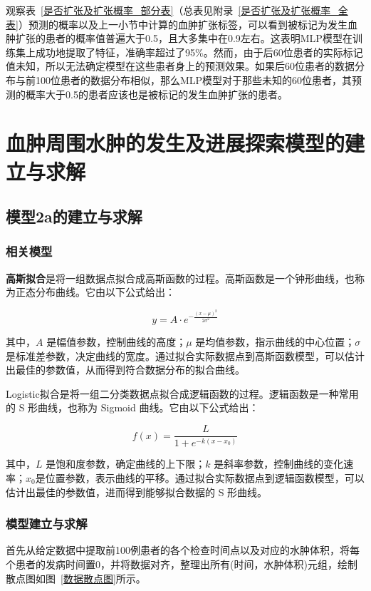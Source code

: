 \documentclass[bwprint]{gmcmthesis}
\begin{document}
观察表~\ref{是否扩张及扩张概率_部分表}（总表见附录~\ref{是否扩张及扩张概率_全表}）预测的概率以及上一小节中计算的血肿扩张标签，可以看到被标记为发生血肿扩张的患者的概率值普遍大于0.5，且大多集中在0.9左右。这表明MLP模型在训练集上成功地提取了特征，准确率超过了95\%。然而，由于后60位患者的实际标记值未知，所以无法确定模型在这些患者身上的预测效果。如果后60位患者的数据分布与前100位患者的数据分布相似，那么MLP模型对于那些未知的60位患者，其预测的概率大于0.5的患者应该也是被标记的发生血肿扩张的患者。

\section{血肿周围水肿的发生及进展探索模型的建立与求解}
\subsection{模型2a的建立与求解}\label{残差计算}
\subsubsection{相关模型}\label{2种回归的章节}

\textbf{高斯拟合}\cite{Wang2018AmphibianSR}是将一组数据点拟合成高斯函数的过程。高斯函数是一个钟形曲线，也称为正态分布曲线。它由以下公式给出：

\begin{equation}
y = A \cdot e^{-\frac{(x - \mu)^2}{2\sigma^2}}
\end{equation}

\noindent 其中，$A$ 是幅值参数，控制曲线的高度；$\mu$ 是均值参数，指示曲线的中心位置；$\sigma$ 是标准差参数，决定曲线的宽度。通过拟合实际数据点到高斯函数模型，可以估计出最佳的参数值，从而得到符合数据分布的拟合曲线。

Logistic拟合是将一组二分类数据点拟合成逻辑函数的过程。逻辑函数是一种常用的 S 形曲线，也称为 Sigmoid 曲线。它由以下公式给出：

\begin{equation}
f(x) = \frac{L}{1 + e^{-k(x-x_0)}}
\end{equation}

\noindent 其中，$L$ 是饱和度参数，确定曲线的上下限；$k$ 是斜率参数，控制曲线的变化速率；$x_0$是位置参数，表示曲线的平移。通过拟合实际数据点到逻辑函数模型，可以估计出最佳的参数值，进而得到能够拟合数据的 S 形曲线。
\subsubsection{模型建立与求解}
首先从给定数据中提取前100例患者的各个检查时间点以及对应的水肿体积，将每个患者的发病时间置0，并将数据对齐，整理出所有(时间，水肿体积)元组，绘制散点图如图~\ref{数据散点图}所示。
\end{document}
